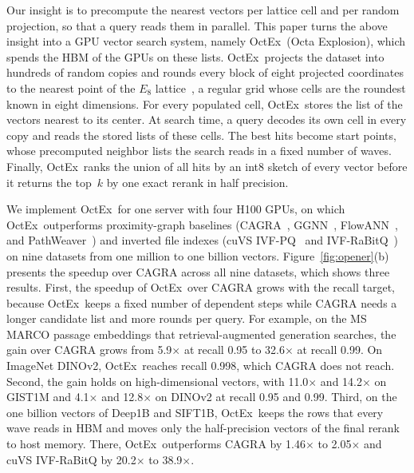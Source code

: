 \documentclass[letterpaper,twocolumn,10pt]{article}
\newcommand{\sysname}{OctEx}
\begin{document}
Our insight is to precompute the nearest vectors per lattice cell and per random projection, so that a query reads them in parallel. This paper turns the above insight into a GPU vector search system, namely \sysname\ (Octa Explosion), which spends the HBM of the GPUs on these lists. \sysname\ projects the dataset into hundreds of random copies and rounds every block of eight projected coordinates to the nearest point of the $E_8$ lattice~\cite{conway1999splag}, a regular grid whose cells are the roundest known in eight dimensions. For every populated cell, \sysname\ stores the list of the vectors nearest to its center. At search time, a query decodes its own cell in every copy and reads the stored lists of these cells. The best hits become start points, whose precomputed neighbor lists the search reads in a fixed number of waves. Finally, \sysname\ ranks the union of all hits by an int8 sketch of every vector before it returns the top~$k$ by one exact rerank in half precision.

We implement \sysname\ for one server with four H100 GPUs, on which \sysname\ outperforms proximity-graph baselines (CAGRA~\cite{ootomo2024cagra}, GGNN~\cite{groh2023ggnn}, FlowANN~\cite{zhao2026flowann}, and PathWeaver~\cite{kim2025pathweaver}) and inverted file indexes (cuVS IVF-PQ~\cite{johnson2019faiss,nvidia2025cuvs} and IVF-RaBitQ~\cite{shi2026ivfrabitq}) on nine datasets from one million to one billion vectors. Figure~\ref{fig:opener}(b) presents the speedup over CAGRA across all nine datasets, which shows three results. First, the speedup of \sysname\ over CAGRA grows with the recall target, because \sysname\ keeps a fixed number of dependent steps while CAGRA needs a longer candidate list and more rounds per query. For example, on the MS MARCO passage embeddings that retrieval-augmented generation searches, the gain over CAGRA grows from 5.9$\times$ at recall 0.95 to 32.6$\times$ at recall 0.99. On ImageNet DINOv2, \sysname\ reaches recall 0.998, which CAGRA does not reach. Second, the gain holds on high-dimensional vectors, with 11.0$\times$ and 14.2$\times$ on GIST1M and 4.1$\times$ and 12.8$\times$ on DINOv2 at recall 0.95 and 0.99. Third, on the one billion vectors of Deep1B and SIFT1B, \sysname\ keeps the rows that every wave reads in HBM and moves only the half-precision vectors of the final rerank to host memory. There, \sysname\ outperforms CAGRA by 1.46$\times$ to 2.05$\times$ and cuVS IVF-RaBitQ by 20.2$\times$ to 38.9$\times$.
\end{document}
